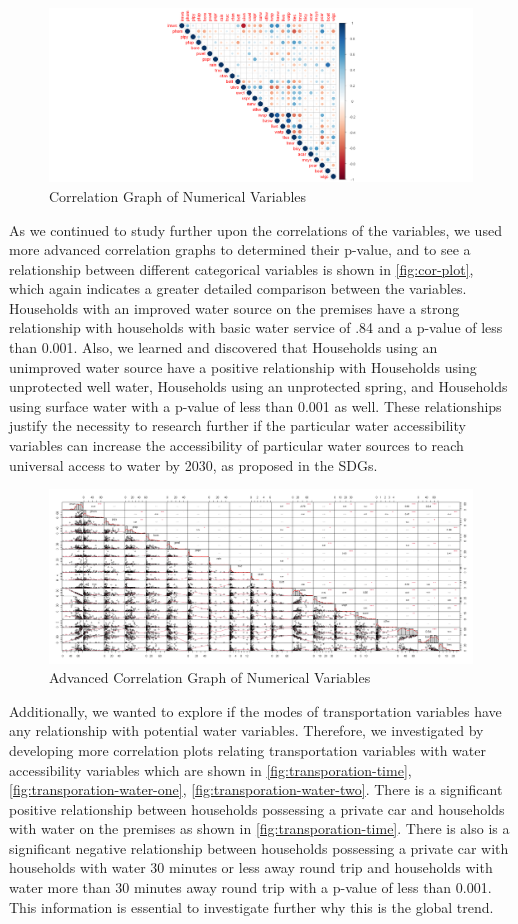 \documentclass[10pt,twoside]{article}
\numberwithin{equation}{section}
\newcommand{\?}{\stackrel{?}{=}}
\begin{document}
\begin{figure}[h!]
  \centering
  \includegraphics[width=.7\textwidth]{correlation-basic}
  \caption{Correlation Graph of Numerical Variables}
  \label{fig:cor-basic}
\end{figure}
As we continued to study further upon the correlations of the variables, we used more advanced correlation graphs to determined their p-value, and to see a relationship between different categorical variables is shown in \autoref{fig:cor-plot}, which again indicates a greater detailed comparison between the variables. Households with an improved water source on the premises have a strong relationship with households with basic water service of .84 and a p-value of less than 0.001. Also, we learned and discovered that Households using an unimproved water source have a positive relationship with Households using unprotected well water, Households using an unprotected spring, and Households using surface water with a p-value of less than 0.001 as well. These relationships justify the necessity to research further if the particular water accessibility variables can increase the accessibility of particular water sources to reach universal access to water by 2030, as proposed in the SDGs. 



\begin{figure}[h!]
  \centering
  \includegraphics[width=.7\textwidth]{adv-cor-plot}
  \caption{Advanced Correlation Graph of Numerical Variables}
  \label{fig:cor-plot}
\end{figure}
Additionally, we wanted to explore if the modes of transportation variables have any relationship with potential water variables. Therefore, we investigated by developing more correlation plots relating transportation variables with water accessibility variables which are shown in \autoref{fig:transporation-time}, \autoref{fig:transporation-water-one}, \autoref{fig:transporation-water-two}. There is a significant positive relationship between households possessing a private car and households with water on the premises as shown in \autoref{fig:transporation-time}. There is also is a significant negative relationship between households possessing a private car with households with water 30 minutes or less away round trip and households with water more than 30 minutes away round trip with a p-value of less than 0.001. This information is essential to investigate further why this is the global trend. 
\end{document}
